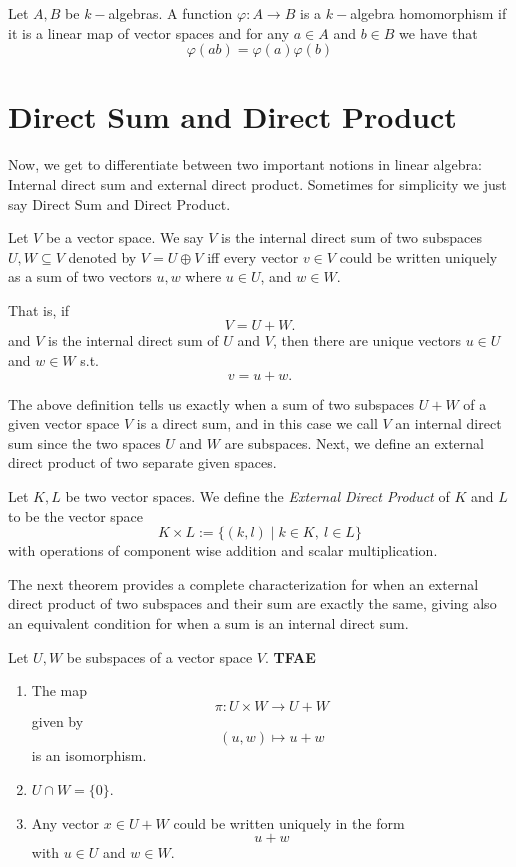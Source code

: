 \begin{definition}
    Let $A,B$ be $k-$algebras. A function $\varphi: A \to B$ is a $k-$algebra homomorphism if it is a linear map of vector spaces and for any $a \in A$ and $b \in B$ we have that 
    \[\varphi(ab) = \varphi(a) \varphi(b)\]
    
\end{definition}

\section{Direct Sum and Direct Product}

Now, we get to differentiate between two important notions in linear algebra: Internal direct sum and external direct product. Sometimes for simplicity we just say Direct Sum and Direct Product.

\begin{definition}
Let $V$ be a vector space. We say $V$ is the internal direct sum of two subspaces $U,W \subseteq V$ denoted by $V = U \oplus V$ iff every vector $v\in V$ could be written uniquely as a sum of two vectors $u,w$
where $u\in U$, and $w\in W$.

That is, if
\[
V=U+W.
\]
and $V$ is the internal direct sum of $U$ and $V$, then
there are unique vectors $u\in U$ and $w\in W$ s.t.
\[
v=u+w.
\]
\end{definition}

The above definition tells us exactly when a sum of two subspaces $U+W$ of a given vector space $V$ is a direct sum, and in this case we call $V$ an internal direct sum since the two spaces $U$ and $W$ are subspaces. Next, we define an external direct product of two separate given spaces.

\begin{definition}
Let $K,L$ be two vector spaces. We define the \emph{External Direct Product} of $K$ and $L$ to be the vector space
\[
K\times L:=\{(k,l)\mid k\in K,\ l\in L\}
\]
with operations of component wise addition and scalar multiplication.
\end{definition}


The next theorem provides a complete characterization for when an external direct product of two subspaces and their sum are exactly the same, giving also an equivalent condition for when a sum is an internal direct sum.

\begin{theorem}
Let $U,W$ be subspaces of a vector space $V$. \textbf{TFAE}

\begin{enumerate}
    \item The map
    \[
    \pi:U\times W\to U+W
    \]
    given by
    \[
    (u,w)\mapsto u+w
    \]
    is an isomorphism.

    \item $ U\cap W=\{0\}.$
    
    \item Any vector $x\in U+W$ could be written uniquely in the form
    \[
    u+w
    \]
    with $u\in U$ and $w\in W$.
\end{enumerate}
\end{theorem}

